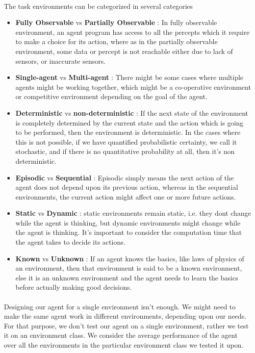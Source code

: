 \documentclass{article}
\begin{document}
\paragraph{}
  The task environments can be categorized in several categories
    \begin{itemize}
      \item \textbf{Fully Observable} vs \textbf{Partially Observable} : In fully observable environment, an agent program has access to all the percepts which it require to make a choice for its action, where as in the partially observable environment, some data or percept is not reachable either due to lack of sensors, or inaccurate sensors.
      \item \textbf{Single-agent} vs \textbf{Multi-agent} : There might be some cases where multiple agents might be working together, which might be a co-operative environment or competitive environment depending on the goal of the agent.
      \item \textbf{Deterministic} vs \textbf{non-deterministic} : If the next state of the environment is completely determined by the current state and the action which is going to be performed, then the environment is deterministic. In the cases where this is not possible, if we have quantified probabilistic certainty, we call it stochastic, and if there is no quantitative probability at all, then it’s non deterministic.
      \item \textbf{Episodic} vs \textbf{Sequential} : Episodic simply means the next action of the agent does not depend upon its previous action, whereas in the sequential environments, the current action might affect one or more future actions.
      \item \textbf{Static} vs \textbf{Dynamic} : static environments remain static, i.e. they dont change while the agent is thinking, but dynamic environments might change while the agent is thinking. It’s important to consider the computation time that the agent takes to decide its actions.
      \item \textbf{Known} vs \textbf{Unknown} : If an agent knows the basics, like laws of physics of an environment, then that environment is said to be a known environment, else it is an unknown environment and the agent needs to learn the basics before actually making good decisions.
    \end{itemize}

\paragraph{}
    Designing our agent for a single environment isn't enough. 
    We might need to make the same agent work in different environments, depending upon our needs.
    For that purpose, we don't test our agent on a single environment, rather we test it on an environment class.
    We consider the average performance of the agent over all the environments in the particular environment class we tested it upon.
\end{document}
